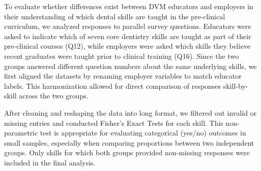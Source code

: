 \documentclass[
  11pt,
  letterpaper,
  DIV=11,
  numbers=noendperiod]{scrartcl}
\numberwithin{figure}{section}
\begin{document}
To evaluate whether differences exist between DVM educators and
employers in their understanding of which dental skills are taught in
the pre-clinical curriculum, we analyzed responses to parallel survey
questions. Educators were asked to indicate which of seven core
dentistry skills are taught as part of their pre-clinical courses (Q12),
while employers were asked which skills they believe recent graduates
were taught prior to clinical training (Q16). Since the two groups
answered different question numbers about the same underlying skills, we
first aligned the datasets by renaming employer variables to match
educator labels. This harmonization allowed for direct comparison of
responses skill-by-skill across the two groups.

After cleaning and reshaping the data into long format, we filtered out
invalid or missing entries and conducted Fisher's Exact Tests for each
skill. This non-parametric test is appropriate for evaluating
categorical (yes/no) outcomes in small samples, especially when
comparing proportions between two independent groups. Only skills for
which both groups provided non-missing responses were included in the
final analysis.
\end{document}
